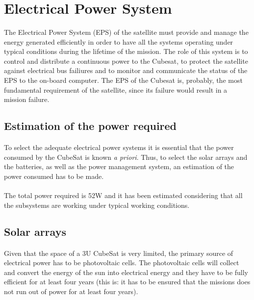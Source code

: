 \section{Electrical Power System}

\paragraph{}The Electrical Power System (EPS) of the satellite must provide and manage the energy generated efficiently in order to have all the systems operating under typical conditions during the lifetime of the mission. The role of this system is to control and distribute a continuous power to the Cubesat, to protect the satellite against electrical bus failiures and to monitor and communicate the status of the EPS to the on-board computer. The EPS of the Cubesat is, probably, the most fundamental requirement of the satellite, since its failure would result in a mission failure.

\subsection{Estimation of the power required}
\paragraph{}To select the adequate electrical power systems it is essential that the power consumed by the CubeSat is known \textit{a priori}. Thus, to select the solar arrays and the batteries, as well as the power management system, an estimation of the power consumed has to be made.

\paragraph{}The total power required is 52W and it has been estimated considering that all the subsystems are working under typical working conditions.

\subsection{Solar arrays}
\paragraph{}Given that the space of a 3U CubeSat is very limited, the primary source of electrical power has to be photovoltaic cells. The photovoltaic cells will collect and convert the energy of the sun into electrical energy and they have to be fully efficient for at least four years (this is: it has to be ensured that the missions does not run out of power for at least four years). 


